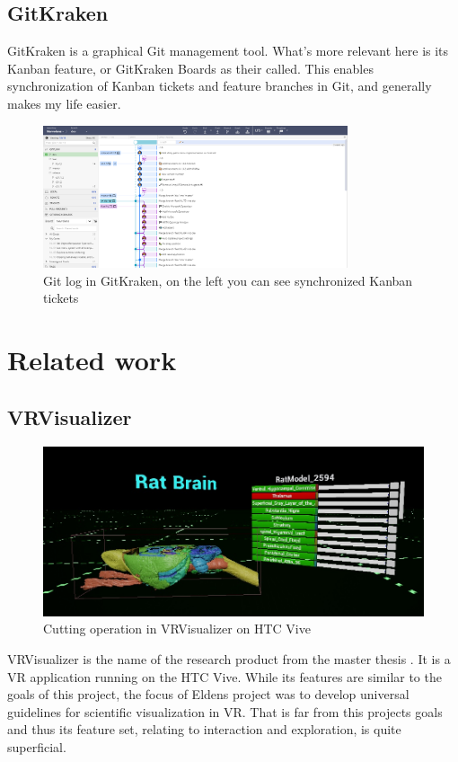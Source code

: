 \subsection*{GitKraken}\label{chap:gitkraken}
GitKraken is a graphical Git management tool. What's more relevant here is its Kanban feature, or GitKraken Boards as their called. This enables synchronization of Kanban tickets and feature branches in Git, and generally makes my life easier.
\begin{figure}[ht]
    \centering
    \includegraphics[width=0.8\textwidth]{fig/gitkraken}
    \caption{Git log in GitKraken, on the left you can see synchronized Kanban tickets}
\end{figure}


\section{Related work}

\subsection*{VRVisualizer}\label{chap:vrvis}
\begin{figure}[ht]
    \centering
    \includegraphics[width=\textwidth]{fig/vrvis_ratbrain.jpg}
    \caption{Cutting operation in VRVisualizer on HTC Vive}
    \label{fig:vrvis}
\end{figure}
VRVisualizer is the name of the research product from the master thesis \citet{Elden2017}. It is a VR application running on the HTC Vive. While its features are similar to the goals of this project, the focus of Eldens project was to develop universal guidelines for scientific visualization in VR. That is far from this projects goals and thus its feature set, relating to interaction and exploration, is quite superficial.


